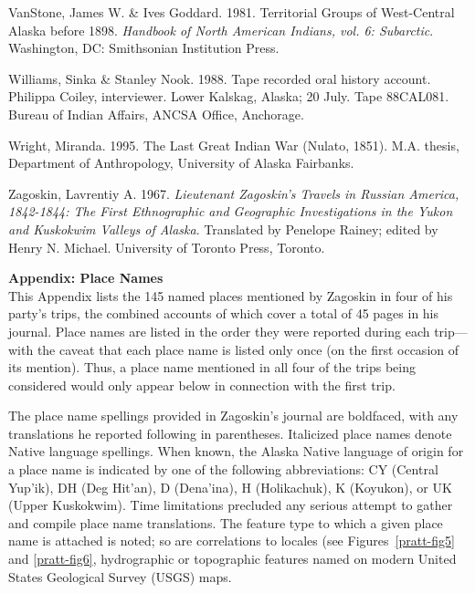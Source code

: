 \begin{hang}
VanStone, James W. \& Ives Goddard. 1981. Territorial Groups of West-Central Alaska before 1898. \textit{Handbook of North American Indians, vol. 6: Subarctic}. Washington, DC: Smithsonian Institution Press.

Williams, Sinka \& Stanley Nook. 1988. Tape recorded oral history account. Philippa Coiley, interviewer. Lower Kalskag, Alaska; 20 July. Tape 88CAL081. Bureau of Indian Affairs, ANCSA Office, Anchorage.

Wright, Miranda. 1995. The Last Great Indian War (Nulato, 1851). M.A. thesis, Department of Anthropology, University of Alaska Fairbanks.

Zagoskin, Lavrentiy A. 1967. \textit{Lieutenant Zagoskin’s Travels in Russian America, 1842-1844: The First Ethnographic and Geographic Investigations in the Yukon and Kuskokwim Valleys of Alaska}.  Translated by Penelope Rainey; edited by Henry N. Michael.  University of Toronto Press, Toronto.


\end{hang}

\vspace{1cm}




\clearpage
\noindent
\textbf{\large Appendix: Place Names} \\


\noindent
This Appendix lists the 145 named places mentioned by Zagoskin in four of his party’s trips, the combined accounts of which cover a total of 45 pages in his journal. Place names are listed in the order they were reported during each trip—with the caveat that each place name is listed only once (on the first occasion of its mention). Thus, a place name mentioned in all four of the trips being considered would only appear below in connection with the first trip.



The place name spellings provided in Zagoskin’s journal are boldfaced, with any translations he reported following in parentheses. Italicized place names denote Native language spellings. When known, the Alaska Native language of origin for a place name is indicated by one of the following abbreviations: CY (Central Yup’ik), DH (Deg Hit’an), D (Dena’ina), H (Holikachuk), K (Koyukon), or UK (Upper Kuskokwim). Time limitations precluded any serious attempt to gather and compile place name translations. The feature type to which a given place name is attached is noted; so are correlations to locales (see Figures~\ref{pratt-fig5} and \ref{pratt-fig6}, hydrographic or topographic features named on modern United States Geological Survey (USGS) maps.



